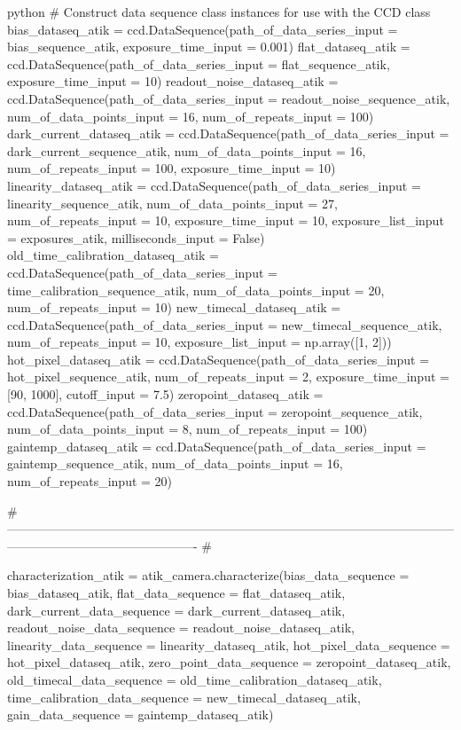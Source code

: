\documentclass[../main.tex]{subfiles}
\begin{document}
\begin{mintedbox}{python}
# Construct data sequence class instances for use with the CCD class
bias_dataseq_atik  =  ccd.DataSequence(path_of_data_series_input  =  bias_sequence_atik,
exposure_time_input  =  0.001)
flat_dataseq_atik  =  ccd.DataSequence(path_of_data_series_input  =  flat_sequence_atik,
exposure_time_input  =  10)
readout_noise_dataseq_atik  =  ccd.DataSequence(path_of_data_series_input  =  readout_noise_sequence_atik,
num_of_data_points_input  =  16,
num_of_repeats_input  =  100)
dark_current_dataseq_atik  =  ccd.DataSequence(path_of_data_series_input  =  dark_current_sequence_atik,
num_of_data_points_input  =  16,
num_of_repeats_input  =  100,
exposure_time_input  =  10)
linearity_dataseq_atik  =  ccd.DataSequence(path_of_data_series_input  =  linearity_sequence_atik,
num_of_data_points_input  =  27,
num_of_repeats_input  =  10,
exposure_time_input  =  10,
exposure_list_input  =  exposures_atik,
milliseconds_input  =  False)
old_time_calibration_dataseq_atik  =  ccd.DataSequence(path_of_data_series_input  =  time_calibration_sequence_atik,
num_of_data_points_input  =  20,
num_of_repeats_input  =  10)
new_timecal_dataseq_atik  =  ccd.DataSequence(path_of_data_series_input  =  new_timecal_sequence_atik,
num_of_repeats_input  =  10,
exposure_list_input  =  np.array([1, 2]))
hot_pixel_dataseq_atik  =  ccd.DataSequence(path_of_data_series_input  =  hot_pixel_sequence_atik,
num_of_repeats_input  =  2,
exposure_time_input  =  [90, 1000],
cutoff_input  =  7.5)
zeropoint_dataseq_atik  =  ccd.DataSequence(path_of_data_series_input  =  zeropoint_sequence_atik,
num_of_data_points_input  =  8,
num_of_repeats_input  =  100)
gaintemp_dataseq_atik  =  ccd.DataSequence(path_of_data_series_input  =  gaintemp_sequence_atik,
num_of_data_points_input  =  16,
num_of_repeats_input  =  20)

# ---------------------------------------------------------------------------------------------------------------------------------------------------------- #

characterization_atik  =  atik_camera.characterize(bias_data_sequence  =  bias_dataseq_atik,
flat_data_sequence  =  flat_dataseq_atik,
dark_current_data_sequence  =  dark_current_dataseq_atik,
readout_noise_data_sequence  =  readout_noise_dataseq_atik,
linearity_data_sequence  =  linearity_dataseq_atik,
hot_pixel_data_sequence  =  hot_pixel_dataseq_atik,
zero_point_data_sequence  =  zeropoint_dataseq_atik,
old_timecal_data_sequence  =  old_time_calibration_dataseq_atik,
time_calibration_data_sequence  =  new_timecal_dataseq_atik,
gain_data_sequence  =  gaintemp_dataseq_atik)


\end{mintedbox}
\end{document}
